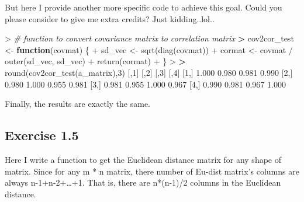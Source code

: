 \documentclass[
]{article}
\newenvironment{Shaded}{\begin{snugshade}}{\end{snugshade}}
\newcommand{\CommentTok}[1]{\textcolor[rgb]{0.56,0.35,0.01}{\textit{#1}}}
\newcommand{\ControlFlowTok}[1]{\textcolor[rgb]{0.13,0.29,0.53}{\textbf{#1}}}
\newcommand{\DecValTok}[1]{\textcolor[rgb]{0.00,0.00,0.81}{#1}}
\newcommand{\ErrorTok}[1]{\textcolor[rgb]{0.64,0.00,0.00}{\textbf{#1}}}
\newcommand{\FloatTok}[1]{\textcolor[rgb]{0.00,0.00,0.81}{#1}}
\newcommand{\FunctionTok}[1]{\textcolor[rgb]{0.00,0.00,0.00}{#1}}
\newcommand{\NormalTok}[1]{#1}
\newcommand{\OtherTok}[1]{\textcolor[rgb]{0.56,0.35,0.01}{#1}}
\newcommand{\SpecialCharTok}[1]{\textcolor[rgb]{0.00,0.00,0.00}{#1}}
\begin{document}
But here I provide another more specific code to achieve this goal.
Could you please consider to give me extra credits? Just kidding..lol..

\begin{Shaded}
\begin{Highlighting}[]
\SpecialCharTok{\textgreater{}} \CommentTok{\# function to convert covariance matrix to correlation matrix}
\ErrorTok{\textgreater{}}\NormalTok{ cov2cor\_test }\OtherTok{\textless{}{-}} \ControlFlowTok{function}\NormalTok{(covmat) \{}
\SpecialCharTok{+}\NormalTok{     sd\_vec }\OtherTok{\textless{}{-}} \FunctionTok{sqrt}\NormalTok{(}\FunctionTok{diag}\NormalTok{(covmat))}
\SpecialCharTok{+}\NormalTok{     cormat }\OtherTok{\textless{}{-}}\NormalTok{ covmat }\SpecialCharTok{/} \FunctionTok{outer}\NormalTok{(sd\_vec, sd\_vec)}
\SpecialCharTok{+}     \FunctionTok{return}\NormalTok{(cormat)}
\SpecialCharTok{+}\NormalTok{ \}}
\SpecialCharTok{\textgreater{}} 
\ErrorTok{\textgreater{}} \FunctionTok{round}\NormalTok{(}\FunctionTok{cov2cor\_test}\NormalTok{(a\_matrix),}\DecValTok{3}\NormalTok{)}
\NormalTok{      [,}\DecValTok{1}\NormalTok{]  [,}\DecValTok{2}\NormalTok{]  [,}\DecValTok{3}\NormalTok{]  [,}\DecValTok{4}\NormalTok{]}
\NormalTok{[}\DecValTok{1}\NormalTok{,] }\FloatTok{1.000} \FloatTok{0.980} \FloatTok{0.981} \FloatTok{0.990}
\NormalTok{[}\DecValTok{2}\NormalTok{,] }\FloatTok{0.980} \FloatTok{1.000} \FloatTok{0.955} \FloatTok{0.981}
\NormalTok{[}\DecValTok{3}\NormalTok{,] }\FloatTok{0.981} \FloatTok{0.955} \FloatTok{1.000} \FloatTok{0.967}
\NormalTok{[}\DecValTok{4}\NormalTok{,] }\FloatTok{0.990} \FloatTok{0.981} \FloatTok{0.967} \FloatTok{1.000}
\end{Highlighting}
\end{Shaded}

Finally, the results are exactly the same.

\hypertarget{exercise-1.5}{%
\subsection{Exercise 1.5}\label{exercise-1.5}}

Here I write a function to get the Euclidean distance matrix for any
shape of matrix. Since for any m * n matrix, there number of Eu-dist
matrix's columns are always n-1+n-2+\ldots+1. That is, there are
n*(n-1)/2 columns in the Euclidean distance.
\end{document}
